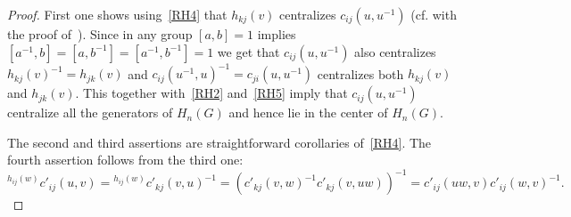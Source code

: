 \documentclass[oneside, 12pt]{amsart}
\theoremstyle{plain}
\numberwithin{equation}{section}
\numberwithin{lemma}{section}
\theoremstyle{remark}
\theoremstyle{definition}
\begin{document}
\begin{proof}
First one shows using~\eqref{RH4} that $h_{kj}(v)$ centralizes $c_{ij}(u, u^{-1})$ (cf. with the proof of~\cite[Lemma~2.1(2)]{Reh78}).
Since in any group $[a, b]=1$ implies $[a^{-1}, b] = [a, b^{-1}] = [a^{-1}, b^{-1}] = 1$ we get that $c_{ij}(u, u^{-1})$ also centralizes $h_{kj}(v)^{-1} = h_{jk}(v)$ and
 $c_{ij}(u^{-1}, u)^{-1} = c_{ji}(u, u^{-1})$ centralizes both $h_{kj}(v)$ and $h_{jk}(v)$.
This together with~\eqref{RH2} and~\eqref{RH5} imply that $c_{ij}(u, u^{-1})$ centralize all the generators of $H_n(G)$ and hence lie in the center of $H_n(G)$.

The second and third assertions are straightforward corollaries of~\eqref{RH4}.
The fourth assertion follows from the third one:
\[{}^{h_{ij}(w)} c'_{ij}(u, v) = {}^{h_{ij}(w)} c'_{kj}(v, u)^{-1} = (c'_{kj}(v, w)^{-1} c'_{kj}(v, uw))^{-1} = c'_{ij}(uw, v) c'_{ij}(w, v)^{-1}.\]

\end{proof}
\end{document}
